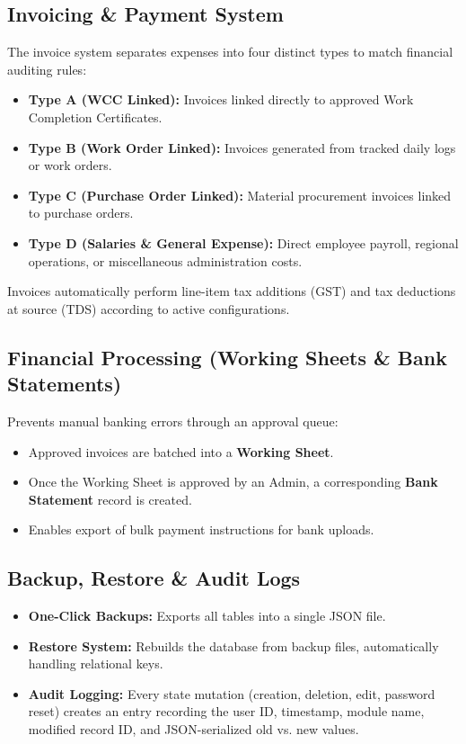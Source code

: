 \documentclass[11pt,a4paper]{article}
\begin{document}
\subsection{Invoicing \& Payment System}
The invoice system separates expenses into four distinct types to match financial auditing rules:
\begin{itemize}
    \item \textbf{Type A (WCC Linked):} Invoices linked directly to approved Work Completion Certificates.
    \item \textbf{Type B (Work Order Linked):} Invoices generated from tracked daily logs or work orders.
    \item \textbf{Type C (Purchase Order Linked):} Material procurement invoices linked to purchase orders.
    \item \textbf{Type D (Salaries \& General Expense):} Direct employee payroll, regional operations, or miscellaneous administration costs.
\end{itemize}
Invoices automatically perform line-item tax additions (GST) and tax deductions at source (TDS) according to active configurations.

\subsection{Financial Processing (Working Sheets \& Bank Statements)}
Prevents manual banking errors through an approval queue:
\begin{itemize}
    \item Approved invoices are batched into a \textbf{Working Sheet}.
    \item Once the Working Sheet is approved by an Admin, a corresponding \textbf{Bank Statement} record is created.
    \item Enables export of bulk payment instructions for bank uploads.
\end{itemize}

\subsection{Backup, Restore \& Audit Logs}
\begin{itemize}
    \item \textbf{One-Click Backups:} Exports all tables into a single JSON file.
    \item \textbf{Restore System:} Rebuilds the database from backup files, automatically handling relational keys.
    \item \textbf{Audit Logging:} Every state mutation (creation, deletion, edit, password reset) creates an entry recording the user ID, timestamp, module name, modified record ID, and JSON-serialized old vs. new values.
\end{itemize}
\end{document}
